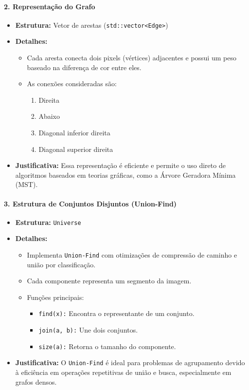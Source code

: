 \documentclass[12pt]{article}
\begin{document}
\paragraph*{\textbf{2. Representação do Grafo}}
\begin{itemize}
    \item \textbf{Estrutura:} Vetor de arestas (\texttt{std::vector<Edge>})
    \item \textbf{Detalhes:}
    \begin{itemize}
        \item Cada aresta conecta dois pixels (vértices) adjacentes e possui um peso baseado na diferença de cor entre eles.
        \item As conexões consideradas são:
        \begin{enumerate}
            \item Direita
            \item Abaixo
            \item Diagonal inferior direita
            \item Diagonal superior direita
        \end{enumerate}
    \end{itemize}
    \item \textbf{Justificativa:} Essa representação é eficiente e permite o uso direto de algoritmos baseados em teorias gráficas, como a Árvore Geradora Mínima (MST).
\end{itemize}

\paragraph*{\textbf{3. Estrutura de Conjuntos Disjuntos (Union-Find)}}
\begin{itemize}
    \item \textbf{Estrutura:} \texttt{Universe}
    \item \textbf{Detalhes:}
    \begin{itemize}
        \item Implementa \texttt{Union-Find} com otimizações de compressão de caminho e união por classificação.
        \item Cada componente representa um segmento da imagem.
        \item Funções principais:
        \begin{itemize}
            \item \texttt{find(x):} Encontra o representante de um conjunto.
            \item \texttt{join(a, b):} Une dois conjuntos.
            \item \texttt{size(a):} Retorna o tamanho do componente.
        \end{itemize}
    \end{itemize}
    \item \textbf{Justificativa:} O \texttt{Union-Find} é ideal para problemas de agrupamento devido à eficiência em operações repetitivas de união e busca, especialmente em grafos densos.
\end{itemize}
\end{document}
